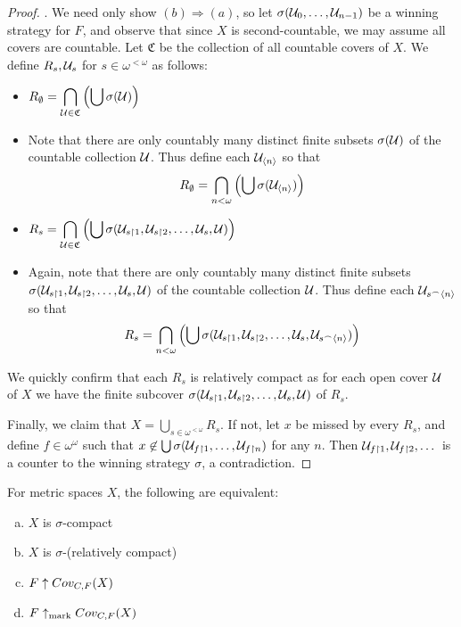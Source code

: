   \begin{proof}.
    We need only show $(b)\Rightarrow(a)$, so let $\sigma(\mathcal{U}_0,\dots,\mathcal{U}_{n-1})$ be a winning strategy for $F$, and observe that since $X$ is second-countable, we may assume all covers are countable. Let $\mathfrak{C}$ be the collection of all countable covers of $X$. We define $R_s,\mathcal{U}_s$ for $s\in\omega^{<\omega}$ as follows:
      \begin{itemize}
        \item $\displaystyle R_\emptyset = \bigcap_{\mathcal{U}\in\mathfrak{C}} \left(\bigcup \sigma(\mathcal{U})\right)$
        \item Note that there are only countably many distinct finite subsets $\sigma(\mathcal{U})$ of the countable collection $\mathcal{U}$. Thus define each $\mathcal{U}_{\langle n\rangle}$ so that
          \[
            R_\emptyset = 
            \bigcap_{n<\omega}\left(\bigcup\sigma(\mathcal{U}_{\langle n\rangle})\right)
          \]
        \item $\displaystyle R_s = \bigcap_{\mathcal{U}\in\mathfrak{C}} \left(\bigcup \sigma(\mathcal{U}_{s\restriction1},\mathcal{U}_{s\restriction2},\dots,\mathcal{U}_s,\mathcal{U})\right)$
        \item Again, note that there are only countably many distinct finite subsets $\sigma(\mathcal{U}_{s\restriction1},\mathcal{U}_{s\restriction2},\dots,\mathcal{U}_s,\mathcal{U})$ of the countable collection $\mathcal{U}$. Thus define each $\mathcal{U}_{s^\frown\langle n\rangle}$ so that 
          \[
            R_s = 
            \bigcap_{n<\omega} \left(\bigcup \sigma(\mathcal{U}_{s\restriction1},\mathcal{U}_{s\restriction2},\dots,\mathcal{U}_s,\mathcal{U}_{s^\frown\langle n\rangle})\right)
          \]
      \end{itemize}

    We quickly confirm that each $R_s$ is relatively compact as for each open cover $\mathcal{U}$ of $X$ we have the finite subcover $\sigma(\mathcal{U}_{s\restriction1},\mathcal{U}_{s\restriction2},\dots,\mathcal{U}_s,\mathcal{U})$ of $R_s$.

    Finally, we claim that $X = \bigcup_{s\in\omega^{<\omega}} R_s$. If not, let $x$ be missed by every $R_s$, and define $f\in\omega^\omega$ such that $x\not\in \bigcup\sigma(\mathcal{U}_{f\restriction1},\dots,\mathcal{U}_{f\restriction n})$ for any $n$. Then $\mathcal{U}_{f\restriction1},\mathcal{U}_{f\restriction2},\dots$ is a counter to the winning strategy $\sigma$, a contradiction.
  \end{proof}

  \begin{corollary}
    For metric spaces $X$, the following are equivalent:
      \begin{enumerate}[(a)]
        \item $X$ is $\sigma$-compact
        \item $X$ is $\sigma$-(relatively compact)
        \item $F \uparrow Cov_{C,F}(X)$
        \item $F \uparrow_{\text{mark}} Cov_{C,F}(X)$
      \end{enumerate}
  \end{corollary}

